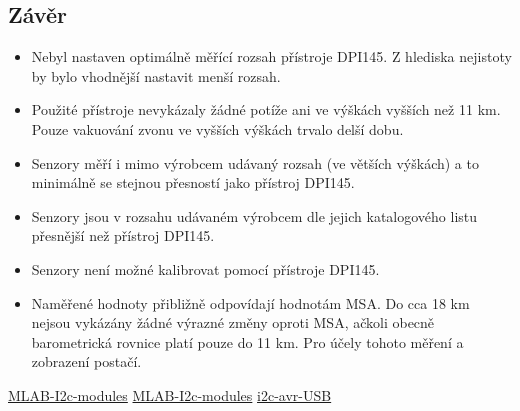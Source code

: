 \documentclass[12pt,a4paper,oneside]{article}
\begin{document}
\subsection{Závěr}

\begin{itemize}
\item Nebyl nastaven optimálně měřící rozsah přístroje DPI145. Z hlediska nejistoty by bylo vhodnější nastavit menší rozsah.
\item Použité přístroje nevykázaly žádné potíže ani ve výškách vyšších než 11 km. Pouze vakuování zvonu ve vyšších výškách trvalo delší dobu.
\item Senzory měří i mimo výrobcem udávaný rozsah (ve větších výškách) a to minimálně se stejnou přesností jako přístroj DPI145.
\item Senzory jsou v rozsahu udávaném výrobcem dle jejich katalogového listu přesnější než přístroj DPI145.
\item Senzory není možné kalibrovat pomocí přístroje DPI145.
\item Naměřené hodnoty přibližně odpovídají hodnotám MSA. Do cca 18 km nejsou vykázány žádné výrazné změny oproti MSA, ačkoli obecně barometrická rovnice platí pouze do 11 km. Pro účely tohoto měření a zobrazení postačí.
\end{itemize}



\begin{thebibliography}{99}
\href{https://github.com/MLAB-project/MLAB-I2c-modules}{MLAB-I2c-modules}
\href{svn://svn.mlab.cz/mlab/Modules/Sensors/ALTIMET01A/SW/Python}{MLAB-I2c-modules}
\href{http://wiki.mlab.cz/doku.php?id=cs:i2c_avr_usb}{i2c-avr-USB}
\end{thebibliography}
\end{document}
